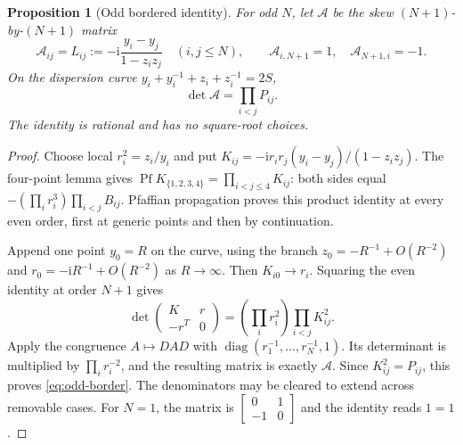 \documentclass[11pt]{article}
\numberwithin{equation}{section}
\newtheorem{proposition}[theorem]{Proposition}
\theoremstyle{remark}\newtheorem{remark}[theorem]{Remark}
\DeclareMathOperator{\Pf}{Pf}
\newcommand{\ii}{\mathrm i}
\begin{document}
\begin{proposition}[Odd bordered identity]\label{prop:complete-product}
\label{prop:local-determinant-coefficient}
For odd $N$, let $\mathcal A$ be the skew $(N+1)$-by-$(N+1)$
matrix
\[
 \mathcal A_{ij}=L_{ij}:=-\ii\frac{y_i-y_j}{1-z_i z_j}
 \quad(i,j\le N),\qquad
 \mathcal A_{i,N+1}=1,\quad \mathcal A_{N+1,i}=-1.
\]
On the dispersion curve $y_i+y_i^{-1}+z_i+z_i^{-1}=2S$,
\begin{equation}\label{eq:odd-border}
 \det\mathcal A=\prod_{i<j}P_{ij}.
\end{equation}
The identity is rational and has no square-root choices.
\end{proposition}
\begin{proof}
Choose local $r_i^2=z_i/y_i$ and put
$K_{ij}=-\ii r_i r_j(y_i-y_j)/(1-z_i z_j)$.
The four-point lemma gives
$\Pf K_{\{1,2,3,4\}}=\prod_{i<j\le4}K_{ij}$:
both sides equal $-(\prod_i r_i^3)\prod_{i<j}B_{ij}$.
Pfaffian propagation proves this product identity at every even
order, first at generic points and then by continuation.

Append one point $y_0=R$ on the curve, using the branch
$z_0=-R^{-1}+O(R^{-2})$ and
$r_0=-\ii R^{-1}+O(R^{-2})$ as $R\to\infty$.
Then $K_{i0}\to r_i$.
Squaring the even identity at order $N+1$ gives
\[
 \det\begin{pmatrix}K&r\\-r^T&0\end{pmatrix}
       =\left(\prod_i r_i^2\right)\prod_{i<j}K_{ij}^2.
\]
Apply the congruence $A\mapsto DAD$ with
$\operatorname{diag}(r_1^{-1},\ldots,r_N^{-1},1)$.
Its determinant is multiplied by $\prod_i r_i^{-2}$,
and the resulting matrix is exactly $\mathcal A$.
Since $K_{ij}^2=P_{ij}$, this proves \eqref{eq:odd-border}.
The denominators may be cleared to extend across removable cases.
For $N=1$, the matrix is $\left[\begin{smallmatrix}0&1\\-1&0\end{smallmatrix}\right]$
and the identity reads $1=1$.
\end{proof}
\end{document}
